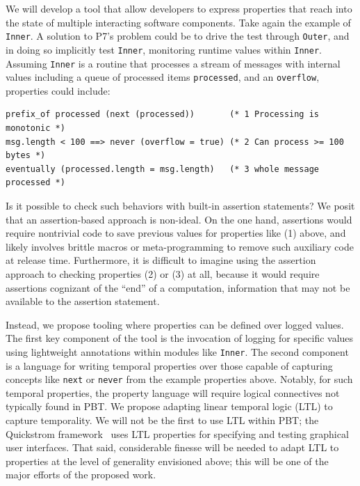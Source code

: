 We will develop a tool that allow developers to express properties that reach
into the state of multiple interacting software components. Take again the
example of \lstinline{Inner}. A solution to P7's problem could be to drive the
test through \lstinline{Outer}, and in doing so implicitly test
\lstinline{Inner}, monitoring runtime values within \lstinline{Inner}. Assuming
\lstinline{Inner} is a routine that processes a stream of messages with internal
values including a queue of processed items \lstinline{processed}, and an
\lstinline{overflow}, properties could include:

\begin{lstlisting}
prefix_of processed (next (processed))       (* 1 Processing is monotonic *)
msg.length < 100 ==> never (overflow = true) (* 2 Can process >= 100 bytes *)
eventually (processed.length = msg.length)   (* 3 whole message processed *)
\end{lstlisting}

Is it possible to check such behaviors with built-in assertion statements? We
posit that an assertion-based approach is non-ideal. On the one hand, assertions
would require nontrivial code to save previous values for properties like (1)
above, and likely involves brittle macros or meta-programming to remove such
auxiliary code at release time. Furthermore, it is difficult to imagine using
the assertion approach to checking properties (2) or (3) at all, because it
would require assertions cognizant of the ``end'' of a computation, information
that may not be available to the assertion statement.

Instead, we propose tooling where properties can be defined over logged values.
The first key component of the tool is the invocation of
logging for specific values using lightweight annotations within modules like
\lstinline{Inner}. The second component is a language for writing temporal
properties over those capable of capturing concepts like \lstinline{next} or
\lstinline{never} from the example properties above. Notably, for such temporal
properties, the property language will require logical connectives not typically
found in PBT. We propose adapting linear temporal logic (LTL) to capture
temporality. We will not be the first to use LTL within PBT; the Quickstrom
framework~\cite{oconnor_quickstrom_2022} uses LTL properties
for specifying and testing graphical user interfaces. That said, considerable
finesse will be needed to adapt LTL to properties at the level of generality
envisioned above; this will be one of the major efforts of the proposed work.

